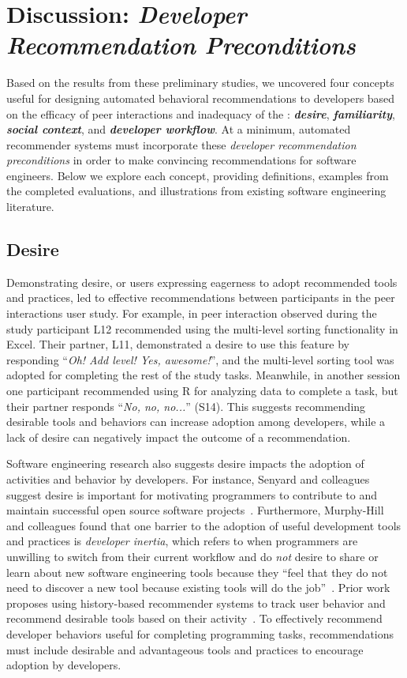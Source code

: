 \section{Discussion: \textit{Developer Recommendation Preconditions}}


Based on the results from these preliminary studies, we uncovered four concepts useful for designing automated behavioral recommendations to developers based on the efficacy of peer interactions and inadequacy of the \tele: \textbf{\em desire}, \textbf{\em familiarity}, \textbf{\em social context}, and \textbf{\em developer workflow}. At a minimum, automated recommender systems must incorporate these \textit{developer recommendation preconditions} in order to make convincing recommendations for software engineers. Below we explore each concept, providing definitions, examples from the completed evaluations, and illustrations from existing software engineering literature.

\subsection{Desire}

Demonstrating desire, or users expressing eagerness to adopt recommended tools and practices, led to effective recommendations between participants in the peer interactions user study. For example, in peer interaction observed during the study participant L12 recommended using the multi-level sorting functionality in Excel. Their partner, L11, demonstrated a desire to use this feature by responding ``\textit{Oh! Add level! Yes, awesome!}'', and the multi-level sorting tool was adopted for completing the rest of the study tasks. Meanwhile, in another session one participant recommended using R for analyzing data to complete a task, but their partner responds ``\textit{No, no, no...}'' (S14). This suggests recommending desirable tools and behaviors can increase adoption among developers, while a lack of desire can negatively impact the outcome of a recommendation. 

Software engineering research also suggests desire impacts the adoption of activities and behavior by developers. For instance, Senyard and colleagues suggest desire is important for motivating programmers to contribute to and maintain successful open source software projects~\cite{senyard2004have}. Furthermore, Murphy-Hill and colleagues found that one barrier to the adoption of useful development tools and practices is \textit{developer inertia}, which refers to when programmers are unwilling to switch from their current workflow and do \textit{not} desire to share or learn about new software engineering tools because they ``feel that they do not need to discover a new tool because existing tools will do the job''~\cite{Murphy-Hill2015HowDoUsers}. Prior work proposes using history-based recommender systems to track user behavior and recommend desirable tools based on their activity~\citep[p.~16]{Murphy-Hill2012Fluency}. To effectively recommend developer behaviors useful for completing programming tasks, recommendations must include desirable and advantageous tools and practices to encourage adoption by developers.

